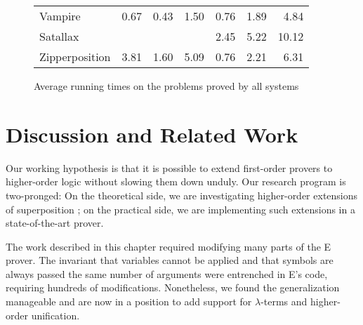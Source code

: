 \begin{rep}
\begin{figure}[ht!]
\begin{tabular}{@{}l@{\hskip 1.5em}r@{\hskip 1em}r@{\hskip 1em}r@{\hskip 1.5em}r@{\hskip 1em}r@{\hskip 1em}r@{}}
Vampire                     & 0.67          & 0.43             & 1.50          &  0.76            & 1.89             & 4.84 \\%
Satallax                    &               &                  &               &  2.45            & 5.22             & 10.12 \\%
Zipperposition              & 3.81          & 1.60             & 5.09          &  0.76            & 2.21             & 6.31
\end{tabular}
\caption{Average running times on the problems proved by all systems}
\label{fig:timing}
\end{figure}
\end{rep}

\section{Discussion and Related Work}
\label{sec:ehoh:discussion-and-related-work}

\begin{rep}
  Our working hypothesis is that it is possible to extend %
  first-order provers to higher-order logic without slowing them down unduly.
  Our research program is two-pronged:
  On the theoretical side, we are
  investigating higher-order extensions of superposition
  \cite{bbcw-21-lfho,bbtvw-21-sup-lam,vn-20-bools};
  on the practical side, we are implementing such extensions in a
  state-of-the-art prover.
  
  The work described in this chapter required modifying many parts of the E
  prover. The invariant that variables cannot be applied and that symbols are always
  passed the same number of arguments were entrenched in E's code,
  requiring hundreds of modifications. Nonetheless,
  we found the generalization manageable and are now in a position to add
  support for $\lambda$-terms and higher-order unification.
  \end{rep}
  
